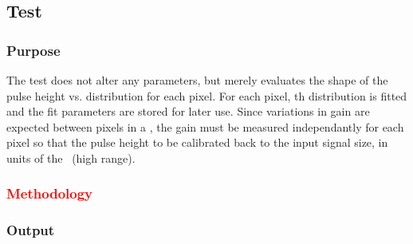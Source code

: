 
\newpage

\subsection{\gainped Test}
\label{ss:gainped}

\subsubsection{Purpose}

The \gainped test does not alter any \dac parameters,
but merely evaluates the shape of the pulse height vs. \vcal distribution for each pixel.
For each pixel, th distribution is fitted and the fit parameters are stored for later use.
Since variations in gain are expected between pixels in a \roc,
the gain must be measured independantly for each pixel so that the pulse height to be calibrated back to the input signal size, 
in units of the \vcal~\dac (high range).

\subsubsection{\textcolor{red}{Methodology}}
\subsubsection{Output}

